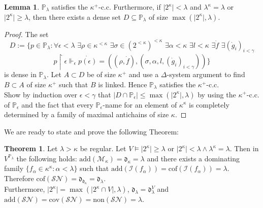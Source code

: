 \documentclass[12pt,a4paper]{scrartcl}
\theoremstyle{definition}
\newtheorem{theorem}[definition]{Theorem}
\newtheorem{lemma}[definition]{Lemma}
\numberwithin{equation}{section}
\begin{document}
\begin{lemma}
$\mathbb{P}_\lambda$ satisfies the $\kappa^+$-c.c. Furthermore, if $\vert 2^\kappa\vert <\lambda$ and $\lambda^\kappa= \lambda$ or $\vert2^\kappa\vert \geq \lambda$, then there exists a dense set $D \subseteq \mathbb{P}_\lambda$ of size $\max(\vert2^\kappa \vert,\lambda)$.
\end{lemma}

\begin{proof}
The set $$D:=\{p \in \mathbb{P}_\lambda \colon \forall \epsilon < \lambda \, \, \exists \rho \in \kappa^{<\kappa} \,\, \exists \sigma \in (2^{<\kappa})^{<\kappa} \,\,  \exists \alpha < \kappa \,\, \exists l < \kappa \,\, \exists \dot{f} \,\, \exists (\dot{g}_i)_{i<\gamma} $$ $$p \restriction \epsilon \Vdash_\epsilon  \dot{p(\epsilon)}=((\rho, \dot{f}),(\sigma, \alpha, l, (\dot{g}_i)_{i<\gamma}))\}$$
is dense in $\mathbb{P}_\lambda$. Let $A\subset D$ be of size $\kappa^+$ and use a $\Delta$-system argument to find $B \subset A$ of size $\kappa^+$ such that $B$ is linked. Hence $\mathbb{P}_\lambda$ satisfies the $\kappa^+$-c.c.\\
Show by induction over $\epsilon < \gamma$ that $\vert D \cap \mathbb{P}_\epsilon\vert \leq \max(\vert 2^\kappa \vert,\lambda)$ by using the $\kappa^+$-c.c. of $\mathbb{P}_\epsilon$ and the fact that every $\mathbb{P}_\epsilon$-name for an element of $\kappa^\kappa$ is completely determined by a family of maximal antichains of size $\kappa$.
\end{proof}

We are ready to state and prove the following Theorem:

\begin{theorem}
Let $\lambda > \kappa$ be regular. Let $V \vDash \vert 2^\kappa\vert \geq \lambda \,\, \text{or} \,\, \vert2^\kappa\vert < \lambda \land \lambda^\kappa=\lambda$. Then in $V^{\mathbb{P}_\lambda}$ the following holds: $\text{add}(\mathcal{M}_\kappa)=\mathfrak{d}_\kappa= \lambda$ and there exists a dominating family $\{f_\alpha \in \kappa^\kappa \colon \alpha < \lambda\}$ such that $\text{add}(\mathcal{I}(f_\alpha))=\text{cof}(\mathcal{I}(f_\alpha)) =\lambda$. Therefore $\text{cof}(\mathcal{SN})=\mathfrak{d}_{\mathfrak{d}_\kappa}= \mathfrak{d}_\lambda$.\\
Furthermore, $\vert 2^\kappa\vert =\max(\vert 2^\kappa \cap V \vert, \lambda)$, $\mathfrak{d}_\lambda=\mathfrak{d}_\lambda^V$ and $\text{add}(\mathcal{SN})= \text{cov}(\mathcal{SN})=\text{non}(\mathcal{SN})=\lambda$.
\end{theorem}
\end{document}
